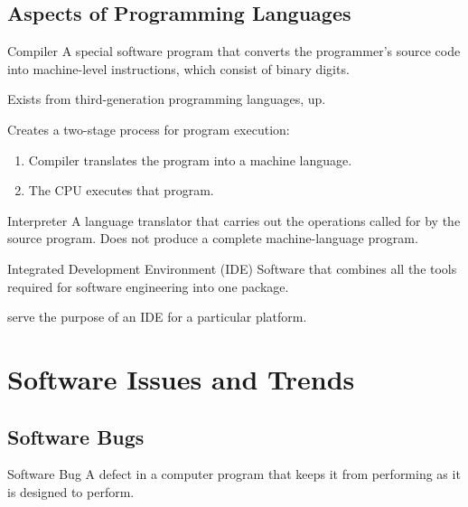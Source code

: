 \documentclass[\main/notes.tex]{subfiles}
\begin{document}
			\subsection{Aspects of Programming Languages}
				\begin{definition}{Compiler}
					A special software program that converts the programmer's source code into machine-level instructions, which consist of binary digits.

					Exists from third-generation programming languages, up.

					Creates a two-stage process for program execution:
					\begin{enumerate}
						\item Compiler translates the program into a machine language.
						\item The CPU executes that program.
					\end{enumerate}
				\end{definition}
				\begin{definition}{Interpreter}
					A language translator that carries out the operations called for by the source program. Does not produce a complete machine-language program.
				\end{definition}
				\begin{definition}{Integrated Development Environment (IDE)}
					Software that combines all the tools required for software engineering into one package.

					 serve the purpose of an IDE for a particular platform.
				\end{definition}

		\section{Software Issues and Trends}
			\subsection{Software Bugs}
				\begin{definition}{Software Bug}
					A defect in a computer program that keeps it from performing as it is designed to perform.
				\end{definition}
\end{document}

